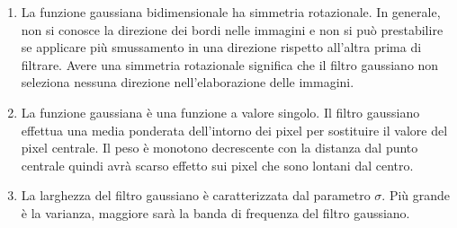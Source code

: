 \documentclass[../main.tex]{subfiles}
\begin{document}
	\begin{enumerate}
		\itemsep0em
		\item La funzione gaussiana bidimensionale ha simmetria rotazionale. In generale, non si conosce la direzione dei bordi nelle immagini e non si può prestabilire se applicare più smussamento in una direzione rispetto all'altra prima di filtrare. Avere una simmetria rotazionale significa che il filtro gaussiano non seleziona nessuna direzione nell'elaborazione delle immagini.
		\item La funzione gaussiana è una funzione a valore singolo. Il filtro gaussiano effettua una media ponderata dell'intorno dei pixel per sostituire il valore del pixel centrale. Il peso è monotono decrescente con la distanza dal punto centrale quindi avrà scarso effetto sui pixel che sono lontani dal centro.
		\item La larghezza del filtro gaussiano è caratterizzata dal parametro $\sigma$. Più grande è la varianza, maggiore sarà la banda di frequenza del filtro gaussiano. \\[-10pt]
		

\end{enumerate}
\end{document}
